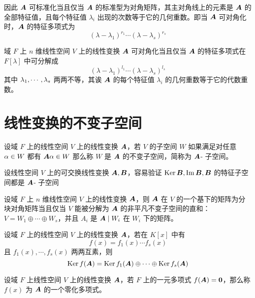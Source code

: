 因此 $\boldsymbol{A}$ 可标准化当且仅当 $\boldsymbol{A}$ 的标准型为对角矩阵，其主对角线上的元素是 $\boldsymbol{A}$ 的全部特征值，且每个特征值 $\lambda_i$ 出现的次数等于它的几何重数。即当 $\boldsymbol{A}$ 可对角化时，$\boldsymbol{A}$ 的特征多项式为
\[ (\lambda - \lambda_1)^{r_1}\cdots(\lambda - \lambda_s)^{r_s} \]

\begin{theorem}
    域 $F$ 上 $n$ 维线性空间 $V$ 上的线性变换 $\boldsymbol{A}$ 可对角化当且仅当 $\boldsymbol{A}$ 的特征多项式在 $F[\lambda]$ 中可分解成
    \[ (\lambda - \lambda_1)^{l_1} \cdots (\lambda - \lambda_s)^{l_s} \]
    其中 $\lambda_1,\cdots,\lambda_s$ 两两不等，其诶 $\boldsymbol{A}$ 的每个特征值 $\lambda_i$ 的几何重数等于它的代数重数。
\end{theorem}

\section{线性变换的不变子空间}

\begin{definition}[不变子空间] 
    设域 $F$ 上的线性空间 $V$ 上的线性变换 $\boldsymbol{A}$，若 $V$ 的子空间 $W$ 如果满足对任意 $\alpha \in W$ 都有 $\boldsymbol{A} \alpha \in W$ 那么称 $W$ 是 $\boldsymbol{A}$ 的不变子空间，简称为 $\boldsymbol{A}$- 子空间。
\end{definition}

设线性空间 $V$ 上的可交换线性变换 $\boldsymbol{A},\boldsymbol{B}$，容易验证 $\operatorname{Ker} \boldsymbol{B},\operatorname{Im} \boldsymbol{B},\boldsymbol{B}$ 的特征子空间都是 $\boldsymbol{A}$- 子空间

\begin{theorem}
    设域 $F$ 上 $n$ 维线性空间 $V$ 上的线性变换 $\boldsymbol{A}$，则 $\boldsymbol{A}$ 在 $V$ 的一个基下的矩阵为分块对角矩阵当且仅当 $V$ 能被分解为 $\boldsymbol{A}$ 的非平凡不变子空间的直和：$V = W_1 \oplus \cdots \oplus W_s$，并且 $A_i$ 是 $\boldsymbol{A} \mid W_i$ 在 $W_i$ 下的矩阵。
\end{theorem}

\begin{theorem}
    设域 $F$ 上的线性空间 $V$ 上的线性变换 $\boldsymbol{A}$，若在 $K[x]$ 中有
    \[ f(x) = f_1(x) \cdots f_s(x) \]
    且 $f_1(x),\cdots,f_s(x)$ 两两互素，则
    \[ \operatorname{Ker} f(\boldsymbol{A}) = \operatorname{Ker} f_1(\boldsymbol{A}) \oplus \cdots \oplus \operatorname{Ker} f_s(\boldsymbol{A}) \]
\end{theorem}

\begin{definition}[零化多项式] 
    设域 $F$ 上线性空间 $V$ 上的线性变换 $\boldsymbol{A}$，若 $F$ 上的一元多项式 $f(\boldsymbol{A}) = \boldsymbol{0}$，那么称 $f(x)$ 为 $\boldsymbol{A}$ 的一个零化多项式。
\end{definition}

